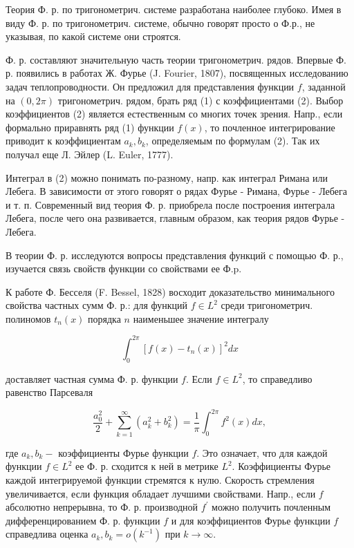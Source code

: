 \documentclass[10pt]{article}
\begin{document}
Теория Ф. р. по тригонометрич. системе разработана наиболее глубоко. Имея в виду Ф. р. по тригонометрич. системе, обычно говорят просто о Ф.р., не указывая, по какой системе они строятся.



Ф. р. составляют значительную часть теории тригонометрич. рядов. Впервые Ф. р. появились в работах Ж. Фурье (J. Fourier, 1807), посвященных исследованию задач теплопроводности. Он предложил для представления функции $f$, заданной на $(0,2 \pi)$ тригонометрич. рядом, брать ряд (1) с коэффициентами (2). Выбор коэффициентов (2) является естественным со многих точек зрения. Напр., если формально приравнять ряд (1) функции $f(x)$, то почленное интегрирование приводит к коэффициентам $a_{k}, b_{k}$, определяемым по формулам (2). Так их получал еще Л. Эйлер (L. Euler, 1777).



Интеграл в (2) можно понимать по-разному, напр. как интеграл Римана или Лебега. В зависимости от этого говорят о рядах Фурье - Римана, Фурье - Лебега и т. п. Современный вид теория Ф. р. приобрела после построения интеграла Лебега, после чего она развивается, главным образом, как теория рядов Фурье - Лебега.



В теории Ф. р. исследуются вопросы представления функций с помощью Ф. р., изучается связь свойств функции со свойствами ее Ф.p.



К работе Ф. Бесселя (F. Bessel, 1828) восходит доказательство минимального свойства частных сумм Ф. р.: для функций $f \in L^{2}$ среди тригонометрич. полиномов $t_{n}(x)$ порядка $n$ наименьшее значение интегралу



\[

\int_{0}^{2 \pi}\left[f(x)-t_{n}(x)\right]^{2} d x

\]



доставляет частная сумма Ф. р. функции $f$. Если $f \in L^{2}$, то справедливо равенство Парсеваля



\[

\frac{a_{0}^{2}}{2}+\sum_{k=1}^{\infty}\left(a_{k}^{2}+b_{k}^{2}\right)=\frac{1}{\pi} \int_{0}^{2 \pi} f^{2}(x) d x,

\]



где $a_{k}, b_{k}-$ коэффициенты Фурье функции $f$. Это означает, что для каждой функции $f \in L^{2}$ ее Ф. р. сходится к ней в метрике $L^{2}$. Коэффициенты Фурье каждой интегрируемой функции стремятся к нулю. Скорость стремления увеличивается, если функция обладает лучшими свойствами. Напр., если $f$ абсолютно непрерывна, то Ф. р. производной $f^{\prime}$ можно получить почленным дифференцированием Ф. р. функции $f$ и для коэффициентов Фурье функции $f$ справедлива оценка $a_{k}, b_{k}=o\left(k^{-1}\right)$ при $k \rightarrow \infty$.
\end{document}
